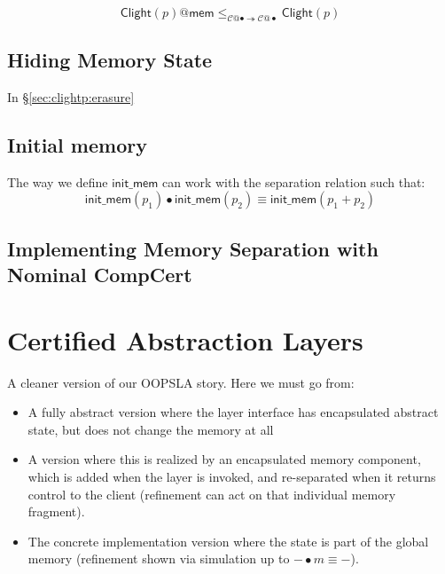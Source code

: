 \documentclass[acmsmall,screen,review,anonymous]{acmart}
\newcommand{\kw}[1]{\ensuremath{ \mathsf{#1} }}
\newcommand{\Clight}{\ensuremath{ \mathsf{Clight} }}
\begin{document}
\begin{lemma}
\[
  \Clight(p)@\kw{mem}
  \le_{\mathcal{C}@{\bullet} \twoheadrightarrow \mathcal{C}@{\bullet}}
  \Clight(p)
\]
\end{lemma}


\subsection{Hiding Memory State} %

In \S\ref{sec:clightp:erasure}



\subsection{Initial memory} %

The way we define $\kw{init\_mem}$ can work with the
separation relation such that:
\[
  \kw{init\_mem}(p_1) \bullet \kw{init\_mem}(p_2) \equiv
  \kw{init\_mem}(p_1 + p_2)
\]


\subsection{Implementing Memory Separation with Nominal CompCert} %



\section{Certified Abstraction Layers} \label{sec:cal} %

{
\color{gray}
A cleaner version of our OOPSLA story.
Here we must go from:
\begin{itemize}
  \item A fully abstract version where the layer interface
    has encapsulated abstract state,
    but does not change the memory at all
  \item A version where this is realized by an encapsulated
    memory component,
    which is added when the layer is invoked,
    and re-separated when it returns control to the client
    (refinement can act on that individual memory fragment).
  \item The concrete implementation version
    where the state is part of the global memory
    (refinement shown via
    simulation up to ${-} \bullet m \equiv {-}$).
\end{itemize}
}
\end{document}
